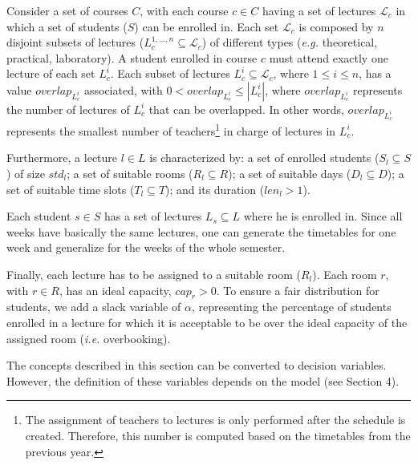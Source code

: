 \documentclass[twocolumn,natbib]{svjour3}          %
\newcounter{constraint}
\begin{document}
Consider a set of courses $C$, with each course $c \in C$ having a set of lectures $\mathcal{L}_c$ in which a set of students ($S$) can be enrolled in. Each set $\mathcal{L}_c$ is composed by $n$ disjoint subsets of lectures ($L_c^{1, \ldots, n} \subseteq \mathcal{L}_c$) of different types (\emph{e.g. }theoretical, practical, laboratory). A student enrolled in course $c$ must attend exactly one lecture of each set $L_c^{i}$. Each subset of lectures $L_c^i \subseteq \mathcal{L}_c$, where $1\leq i \leq n$, has a value $overlap_{L_c^{i}}$ associated, with $0 < overlap_{L_c^{i}} \leq |L_c^{i}|$, where $overlap_{L_c^{i}}$ represents the number of lectures of $L_c^{i}$ that can be overlapped. In other words, $overlap_{L_c^{i}}$  represents the smallest number of teachers\footnote{The assignment of teachers to lectures is only performed after the schedule is created. Therefore, this number is computed based on the timetables from the previous year.\vspace{.5cm}} in charge of lectures in $L_c^i$. 

Furthermore, a lecture $l \in L$ is characterized by: a set of enrolled students ($S_l \subseteq S$) of size $std_l$; a set of suitable rooms ($R_l \subseteq R$);
a set of suitable days  ($D_l \subseteq D$);
a set of suitable  time slots ($T_l \subseteq T$);
and its duration ($len_l > 1$).

Each student $s \in S$ has a set of lectures $L_s \subseteq L$ where he is enrolled in. Since all weeks have basically the same lectures, one can generate the timetables for one week and generalize for the weeks of the whole semester.


Finally, each lecture has to be assigned to a suitable room ($R_l$). Each room $r$, with $r \in R$, has an ideal capacity, $cap_r > 0$. To ensure a fair distribution for students, we add a slack variable of $\alpha$, representing the percentage of students enrolled in a lecture for which it is acceptable to be over the ideal capacity of the assigned room (\emph{i.e.} overbooking).

The concepts described in this section can be converted to decision variables. However, the definition of these variables depends on the model (see Section 4).


\end{document}

